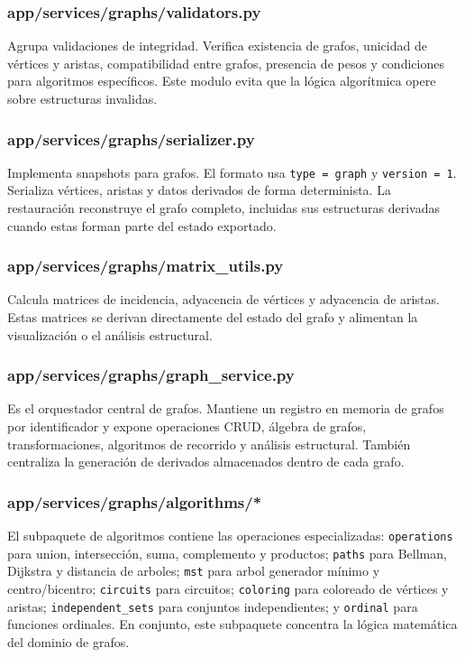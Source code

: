 \documentclass[12pt,onecolumn]{IEEEtran}
\begin{document}
\subsubsection{app/services/graphs/validators.py}
Agrupa validaciones de integridad. Verifica existencia de grafos, unicidad de vértices y aristas, compatibilidad entre grafos, presencia de pesos y condiciones para algoritmos específicos. Este modulo evita que la lógica algorítmica opere sobre estructuras invalidas.

\subsubsection{app/services/graphs/serializer.py}
Implementa snapshots para grafos. El formato usa \texttt{type = graph} y \texttt{version = 1}. Serializa vértices, aristas y datos derivados de forma determinista. La restauración reconstruye el grafo completo, incluidas sus estructuras derivadas cuando estas forman parte del estado exportado.

\subsubsection{app/services/graphs/matrix\_utils.py}
Calcula matrices de incidencia, adyacencia de vértices y adyacencia de aristas. Estas matrices se derivan directamente del estado del grafo y alimentan la visualización o el análisis estructural.

\subsubsection{app/services/graphs/graph\_service.py}
Es el orquestador central de grafos. Mantiene un registro en memoria de grafos por identificador y expone operaciones CRUD, álgebra de grafos, transformaciones, algoritmos de recorrido y análisis estructural. También centraliza la generación de derivados almacenados dentro de cada grafo.

\subsubsection{app/services/graphs/algorithms/*}
El subpaquete de algoritmos contiene las operaciones especializadas: \texttt{operations} para union, intersección, suma, complemento y productos; \texttt{paths} para Bellman, Dijkstra y distancia de arboles; \texttt{mst} para arbol generador mínimo y centro/bicentro; \texttt{circuits} para circuitos; \texttt{coloring} para coloreado de vértices y aristas; \texttt{independent\_sets} para conjuntos independientes; y \texttt{ordinal} para funciones ordinales. En conjunto, este subpaquete concentra la lógica matemática del dominio de grafos.
\end{document}
